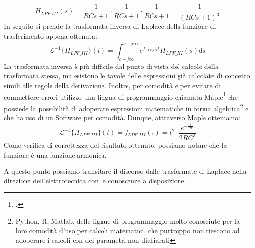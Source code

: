 \documentclass[a4paper, 10pt, final]{article} %
\begin{document}
    \begin{equation*}
        H_{LPF\_III}(s) = \frac{1}{RCs+1} \cdot \frac{1}{RCs+1} \cdot \frac{1}{RCs+1} = \frac{1}{\left(RCs+1\right)^3}
    \end{equation*}
    \noindent In seguito si prende la trasformata inversa di Laplace della funzione di trasferimento appena ottenuta:
    \begin{equation*}
        \mathcal{L}^{-1}\{H_{LPF\_III}\}(t) = \int_{c-j\infty}^{c+j\infty} e^{f_{LPF\_III}t} H_{LPF\_III}(s) \mathrm{d}s
    \end{equation*}
    \noindent La trasformata inversa \`{e} pi\`{u} difficile dal punto di vista del calcolo della trasformata stessa, ma esistono le tavole delle espressioni gi\`{a} calcolate di concetto simili alle regole della derivazione.
    Inoltre, per comodit\`{a} e per evitare di commettere errori utilizzo una lingua di programmaggio chiamata Maple\footcite[]{Maplesoft:Software} che possiede la possibilit\`{a} di adoperare espressioni matematiche in forma algebrica\footnote{Python, R, Matlab, delle lignue di programmaggio molto conosciute per la loro comodit\`{a} d'uso per calcoli matematici, che purtroppo non riescono ad adoperare i calcoli con dei parametri non dichiarati} e che ha uso di un Software per comodit\`{a}.
    Dunque, attraverso Maple otteniamo:
    \begin{equation*}
        \mathcal{L}^{-1}\{H_{LPF\_III}\}(t) = f_{LPF\_III}(t) = t^2 \cdot \frac{e^{-\frac{t}{RC}}}{2RC^3}
    \end{equation*}
    Come verifica di correttezza del risultato ottenuto, possiamo notare che la funzione \`{e} una funzione armonica.

    A questo punto possiamo transitare il discorso dalle trasformate di Laplace nella direzione dell'elettrotecnica con le conoscenze a disposizione.
\end{document}
